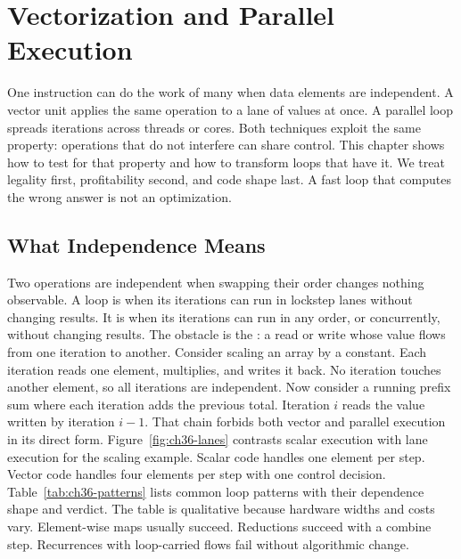 \chapter{Vectorization and Parallel Execution}\label{ch:vectorization-parallel-execution}

One instruction can do the work of many when data elements are independent.
A vector unit applies the same operation to a lane of values at once.
A parallel loop spreads iterations across threads or cores.
Both techniques exploit the same property: operations that do not interfere can share control.
This chapter shows how to test for that property and how to transform loops that have it.
We treat legality first, profitability second, and code shape last.
A fast loop that computes the wrong answer is not an optimization.

\section{What Independence Means}\label{sec:ch36-independence}

Two operations are independent when swapping their order changes nothing observable.
A loop is  when its iterations can run in lockstep lanes without changing results.
It is  when its iterations can run in any order, or concurrently, without changing results.
The obstacle is the : a read or write whose value flows from one iteration to another.
Consider scaling an array by a constant.
Each iteration reads one element, multiplies, and writes it back.
No iteration touches another element, so all iterations are independent.
Now consider a running prefix sum where each iteration adds the previous total.
Iteration $i$ reads the value written by iteration $i - 1$.
That chain forbids both vector and parallel execution in its direct form.
Figure~\ref{fig:ch36-lanes} contrasts scalar execution with lane execution for the scaling example.
Scalar code handles one element per step.
Vector code handles four elements per step with one control decision.
Table~\ref{tab:ch36-patterns} lists common loop patterns with their dependence shape and verdict.
The table is qualitative because hardware widths and costs vary.
Element-wise maps usually succeed.
Reductions succeed with a combine step.
Recurrences with loop-carried flows fail without algorithmic change.

